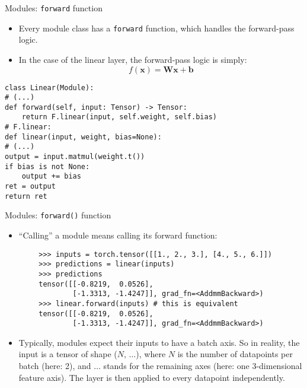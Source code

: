 \begin{frame}[fragile]{Modules: \texttt{forward} function}
\begin{itemize}
\item Every module class has a \texttt{forward} function, which handles the forward-pass logic.
\item In the case of the linear layer, the forward-pass logic is simply:
$$ f(\mathbf{x}) = \mathbf{W} \mathbf{x} + \mathbf{b}$$
\end{itemize}
\begin{verbatim}
class Linear(Module):
# (...)
def forward(self, input: Tensor) -> Tensor:
	return F.linear(input, self.weight, self.bias)
# F.linear:
def linear(input, weight, bias=None):
# (...)
output = input.matmul(weight.t())
if bias is not None:
	output += bias
ret = output
return ret
\end{verbatim}
\end{frame}
	
\begin{vbframe}{Modules: \texttt{forward()} function}
\begin{itemize}
\item ``Calling'' a module means calling its forward function:
\end{itemize}
\begin{verbatim}
		>>> inputs = torch.tensor([[1., 2., 3.], [4., 5., 6.]])
		>>> predictions = linear(inputs)
		>>> predictions
		tensor([[-0.8219,  0.0526],
				[-1.3313, -1.4247]], grad_fn=<AddmmBackward>)
		>>> linear.forward(inputs) # this is equivalent
		tensor([[-0.8219,  0.0526],
				[-1.3313, -1.4247]], grad_fn=<AddmmBackward>)
\end{verbatim}
\vfill
\begin{itemize}
\item Typically, modules expect their inputs to have a batch axis. So in reality, the input is a tensor of shape ($N$, $\ldots$), where $N$ is the number of datapoints per batch (here: 2), and $\ldots$ stands for the remaining axes (here: one 3-dimensional feature axis).
The layer is then applied to every datapoint independently.
\end{itemize}
\end{vbframe}
	

